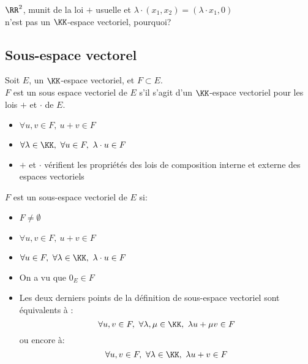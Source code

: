 \documentclass[../main.tex]{subfile}
\begin{document}
\begin{rema}
	$\RR^2$, munit de la loi $+$ usuelle et $\lambda \cdot (x_1, x_2) = (\lambda \cdot x_1, 0)$\\
	n'est pas un $\KK$-espace vectoriel, pourquoi?
\end{rema}

\subsection{Sous-espace vectorel}

\begin{defi}
	Soit $E$, un $\KK$-espace vectoriel, et $F \subset E$.\\
	$F$ est un sous espace vectoriel de $E$ s'il s'agit d'un $\KK$-espace vectoriel pour les lois $+$ et $\cdot$ de $E$.
\begin{itemize}
	\item $\forall u, v \in F, \ u + v \in F$
	\item $\forall \lambda \in \KK, \ \forall u \in F, \ \lambda \cdot u \in F$
	\item $+$ et $\cdot$ vérifient les propriétés des lois de composition interne et externe des espaces vectoriels
\end{itemize}
\end{defi}

\begin{propri}
	$F$ est un sous-espace vectoriel de $E$ si:
\begin{itemize}
	\item $F \neq \emptyset$
	\item $\forall u, v \in F, \ u+v \in F$
	\item $\forall u \in F, \ \forall \lambda \in \KK, \ \lambda \cdot u \in F$
\end{itemize}
\end{propri}

\begin{rema}
\begin{itemize}	
	\item On a vu que $0_E \in F$
	\item Les deux derniers points de la définition de sous-espace vectoriel sont équivalents à :
	$$\forall u, v \in F, \ \forall \lambda, \mu \in \KK, \ \lambda u + \mu v \in F$$
	ou encore à:
	$$\forall u, v \in F, \ \forall \lambda \in \KK, \ \lambda u + v \in F$$
\end{itemize}
\end{rema}

\end{document}
